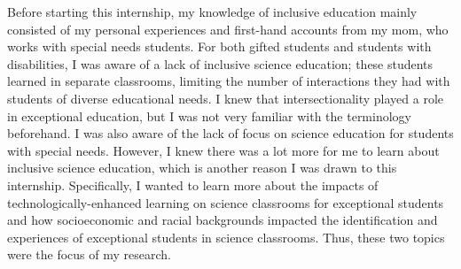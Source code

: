\documentclass[11.5pt]{sig-alternate}
\begin{document}
\begin{large}
Before starting this internship, my knowledge of inclusive education mainly consisted of my personal experiences and first-hand accounts from my mom, who works with special needs students. For both gifted students and students with disabilities, I was aware of a lack of inclusive science education; these students learned in separate classrooms, limiting the number of interactions they had with students of diverse educational needs. I knew that intersectionality played a role in exceptional education, but I was not very familiar with the terminology beforehand. I was also aware of the lack of focus on science education for students with special needs. However, I knew there was a lot more for me to learn about inclusive science education, which is another reason I was drawn to this internship. Specifically, I wanted to learn more about the impacts of technologically-enhanced learning on science classrooms for exceptional students and how socioeconomic and racial backgrounds impacted the identification and experiences of exceptional students in science classrooms. Thus, these two topics were the focus of my research.


\end{large}
\end{document}
